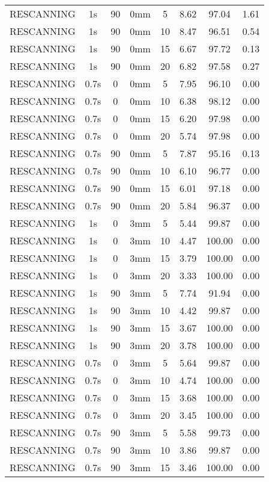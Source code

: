 \begin{table}[H]
\begin{tabular}{|c||c|c|c|c||c|c|c|}
RESCANNING & 1s & 90 & 0mm & 5 & 8.62 & 97.04 & 1.61 \\
RESCANNING & 1s & 90 & 0mm & 10 & 8.47 & 96.51 & 0.54 \\
RESCANNING & 1s & 90 & 0mm & 15 & 6.67 & 97.72 & 0.13 \\
RESCANNING & 1s & 90 & 0mm & 20 & 6.82 & 97.58 & 0.27 \\
RESCANNING & 0.7s & 0 & 0mm & 5 & 7.95 & 96.10 & 0.00 \\
RESCANNING & 0.7s & 0 & 0mm & 10 & 6.38 & 98.12 & 0.00 \\
RESCANNING & 0.7s & 0 & 0mm & 15 & 6.20 & 97.98 & 0.00 \\
RESCANNING & 0.7s & 0 & 0mm & 20 & 5.74 & 97.98 & 0.00 \\
RESCANNING & 0.7s & 90 & 0mm & 5 & 7.87 & 95.16 & 0.13 \\
RESCANNING & 0.7s & 90 & 0mm & 10 & 6.10 & 96.77 & 0.00 \\
RESCANNING & 0.7s & 90 & 0mm & 15 & 6.01 & 97.18 & 0.00 \\
RESCANNING & 0.7s & 90 & 0mm & 20 & 5.84 & 96.37 & 0.00 \\
RESCANNING & 1s & 0 & 3mm & 5 & 5.44 & 99.87 & 0.00 \\
RESCANNING & 1s & 0 & 3mm & 10 & 4.47 & 100.00 & 0.00 \\
RESCANNING & 1s & 0 & 3mm & 15 & 3.79 & 100.00 & 0.00 \\
RESCANNING & 1s & 0 & 3mm & 20 & 3.33 & 100.00 & 0.00 \\
RESCANNING & 1s & 90 & 3mm & 5 & 7.74 & 91.94 & 0.00 \\
RESCANNING & 1s & 90 & 3mm & 10 & 4.42 & 99.87 & 0.00 \\
RESCANNING & 1s & 90 & 3mm & 15 & 3.67 & 100.00 & 0.00 \\
RESCANNING & 1s & 90 & 3mm & 20 & 3.78 & 100.00 & 0.00 \\
RESCANNING & 0.7s & 0 & 3mm & 5 & 5.64 & 99.87 & 0.00 \\
RESCANNING & 0.7s & 0 & 3mm & 10 & 4.74 & 100.00 & 0.00 \\
RESCANNING & 0.7s & 0 & 3mm & 15 & 3.68 & 100.00 & 0.00 \\
RESCANNING & 0.7s & 0 & 3mm & 20 & 3.45 & 100.00 & 0.00 \\
RESCANNING & 0.7s & 90 & 3mm & 5 & 5.58 & 99.73 & 0.00 \\
RESCANNING & 0.7s & 90 & 3mm & 10 & 3.86 & 99.87 & 0.00 \\
RESCANNING & 0.7s & 90 & 3mm & 15 & 3.46 & 100.00 & 0.00 \\

\end{tabular}
\end{table}
